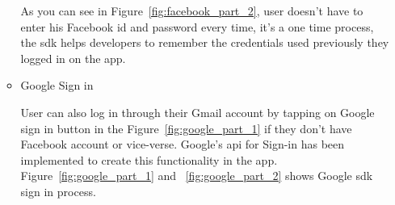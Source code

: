 \begin{itemize}
\begin{itemize}
        As you can see in Figure~\ref{fig:facebook_part_2}, user doesn't have to enter his Facebook id and password every time, it's a one time process, the \gls{sdk} helps developers to remember the credentials used previously they logged in on the app.
        
      
        \item Google Sign in
        
        User can also log in through their Gmail account by tapping on Google sign in button in the Figure~\ref{fig:google_part_1} if they don't have Facebook account or vice-verse. Google's \gls{api} for Sign-in has been implemented to create this functionality in the app. Figure~\ref{fig:google_part_1} and ~\ref{fig:google_part_2} shows Google \gls{sdk} sign in process. \\
        

\end{itemize}
\end{itemize}
